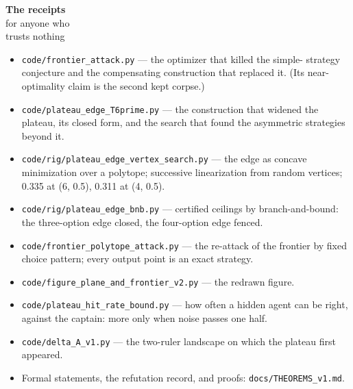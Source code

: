 \begin{receipts}{\textbf{The receipts}\\for anyone who\\trusts nothing}


\begin{itemize}
\tightlist
\item
  \texttt{code/\allowbreak{}frontier\_\allowbreak{}attack.\allowbreak{}py} --- the optimizer that killed the simple-
  strategy conjecture and the compensating construction that replaced
  it. (Its near-optimality claim is the second kept corpse.)
\item
  \texttt{code/\allowbreak{}plateau\_\allowbreak{}edge\_\allowbreak{}T6prime.\allowbreak{}py} --- the construction that widened the
  plateau, its closed form, and the search that found the asymmetric
  strategies beyond it.
\item
  \texttt{code/\allowbreak{}rig/\allowbreak{}plateau\_\allowbreak{}edge\_\allowbreak{}vertex\_\allowbreak{}search.\allowbreak{}py} --- the edge as concave
  minimization over a polytope; successive linearization from random
  vertices; 0.335 at (6, 0.5), 0.311 at (4, 0.5).
\item
  \texttt{code/\allowbreak{}rig/\allowbreak{}plateau\_\allowbreak{}edge\_\allowbreak{}bnb.\allowbreak{}py} --- certified ceilings by
  branch-and-bound: the three-option edge closed, the four-option edge
  fenced.
\item
  \texttt{code/\allowbreak{}frontier\_\allowbreak{}polytope\_\allowbreak{}attack.\allowbreak{}py} --- the re-attack of the frontier by
  fixed choice pattern; every output point is an exact strategy.
\item
  \texttt{code/\allowbreak{}figure\_\allowbreak{}plane\_\allowbreak{}and\_\allowbreak{}frontier\_\allowbreak{}v2.\allowbreak{}py} --- the redrawn figure.
\item
  \texttt{code/\allowbreak{}plateau\_\allowbreak{}hit\_\allowbreak{}rate\_\allowbreak{}bound.\allowbreak{}py} --- how often a hidden agent can be
  right, against the captain: more only when noise passes one half.
\item
  \texttt{code/\allowbreak{}delta\_\allowbreak{}A\_\allowbreak{}v1.\allowbreak{}py} --- the two-ruler landscape on which the plateau
  first appeared.
\item
  Formal statements, the refutation record, and proofs:
  \texttt{docs/\allowbreak{}THEOREMS\_\allowbreak{}v1.\allowbreak{}md}.
\end{itemize}

\end{receipts}


